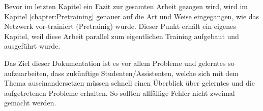 Bevor im letzten Kapitel ein Fazit zur gesamten Arbeit gezogen wird, wird im Kapitel \ref{chapter:Pretraining} genauer auf die Art und Weise eingegangen, wie das Netzwerk vor-trainiert (Pretrainig) wurde. Dieser Punkt erhält ein eigenes Kapitel, weil diese Arbeit parallel zum eigentlichen Training aufgebaut und ausgeführt wurde.

Das Ziel dieser Dokumentation ist es vor allem Probleme und gelerntes so aufzuarbeiten, dass zukünftige Studenten/Assistenten, welche sich mit dem Thema auseinandersetzen müssen schnell einen Überblick über gelerntes und die aufgetretenen Probleme erhalten.
So sollten allfällige Fehler nicht zweimal gemacht werden.

